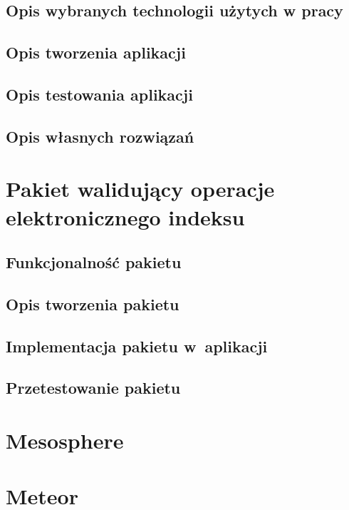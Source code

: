 \documentclass[brudnopis]{xmgr}
\begin{document}
\section{Opis wybranych technologii użytych w pracy}

\section{Opis tworzenia aplikacji}
\cite{Introduction}
\cite{MeteorDocs}
\cite{DiscoverMeteor2013}
\cite{NodeDocs}
\cite{MongoDocs}
\cite{ScalingMongoDB2011}
\cite{ScalingWithMongoDB}
\section{Opis testowania aplikacji}
\cite{Laika}
\section{Opis własnych rozwiązań}


\chapter{Pakiet walidujący operacje elektronicznego indeksu}

\section{Funkcjonalność pakietu}
\section{Opis tworzenia pakietu}
\cite{Packages}
\cite{MeteorDocs}
\cite{DiscoverMeteor2013}
\section{Implementacja pakietu w~aplikacji}
\section{Przetestowanie pakietu}
\cite{TinyTest}

\summary

\appendix
\chapter{Mesosphere}


\chapter{Meteor}
\end{document}
